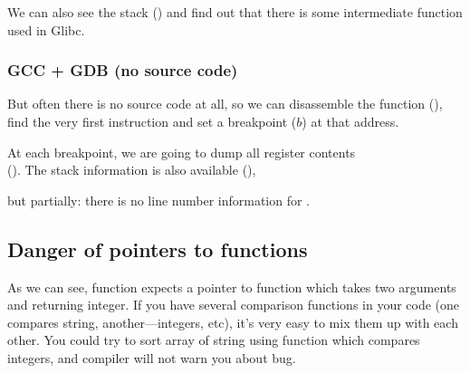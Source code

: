 We can also see the stack () and find out that there is some intermediate function  used in Glibc.



\subsubsection{GCC + GDB (no source code)}

But often there is no source code at all, so we can disassemble the \comp function (), find the very first
\CMP instruction and set a breakpoint ($b$) at that address.

At each breakpoint, we are going to dump all register contents\\
().
The stack information is also available (), 

but partially: there is no line number information for \comp.



\subsection{Danger of pointers to functions}

As we can see, \qsort function expects a pointer to function which takes two  arguments and
returning integer.
If you have several comparison functions in your code (one compares string, another---integers, etc), it's very easy to
mix them up with each other.
You could try to sort array of string using function which compares integers, and compiler will not warn you about bug.

